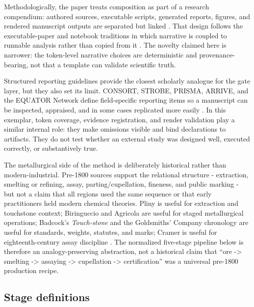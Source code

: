 \documentclass[
]{article}
\begin{document}
Methodologically, the paper treats composition as part of a research
compendium: authored sources, executable scripts, generated reports,
figures, and rendered manuscript outputs are separated but linked
\citep{marwick2018packaging}. That design follows the executable-paper
and notebook traditions in which narrative is coupled to runnable
analysis rather than copied from it
\citep{leisch2002sweave, rule2019jupyter}. The novelty claimed here is
narrower: the token-level narrative choices are deterministic and
provenance-bearing, not that a template can validate scientific truth.

Structured reporting guidelines provide the closest scholarly analogue
for the gate layer, but they also set its limit. CONSORT, STROBE,
PRISMA, ARRIVE, and the EQUATOR Network define field-specific reporting
items so a manuscript can be inspected, appraised, and in some cases
replicated more easily
\citep{schulz2010consort, vonelm2007strobe, page2021prisma, percie_du_sert2020arrive, equator_network_reporting_guidelines}.
In this exemplar, token coverage, evidence registration, and render
validation play a similar internal role: they make omissions visible and
bind declarations to artifacts. They do not test whether an external
study was designed well, executed correctly, or substantively true.

The metallurgical side of the method is deliberately historical rather
than modern-industrial. Pre-1800 sources support the relational
structure - extraction, smelting or refining, assay,
parting/cupellation, fineness, and public marking - but not a claim that
all regions used the same sequence or that early practitioners held
modern chemical theories. Pliny is useful for extraction and touchstone
context; Biringuccio and Agricola are useful for staged metallurgical
operations; Badcock's \emph{Touch-stone} and the Goldsmiths' Company
chronology are useful for standards, weights, statutes, and marks;
Cramer is useful for eighteenth-century assay discipline
\citep{pliny_natural_history_33, biringuccio_pirotechnia_1540, agricola_de_re_metallica_1556, badcock_touchstone_1678, goldsmiths_hallmarking_history, cramer_assaying_metals_1741}.
The normalized five-stage pipeline below is therefore an
analogy-preserving abstraction, not a historical claim that ``ore
-\textgreater{} smelting -\textgreater{} assaying -\textgreater{}
cupellation -\textgreater{} certification'' was a universal pre-1800
production recipe.

\subsection{Stage definitions}\label{stage-definitions}
\end{document}
